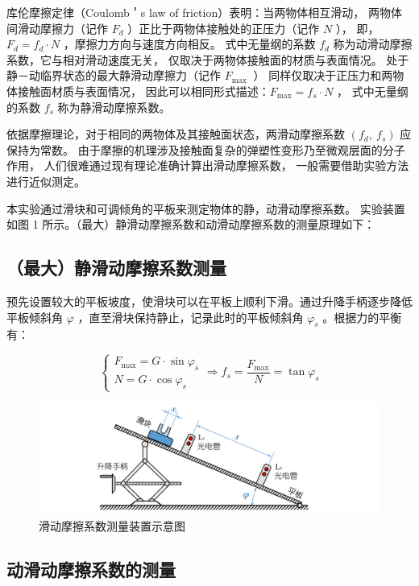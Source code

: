 库伦摩擦定律（Coulomb＇s law of friction）表明：当两物体相互滑动，
两物体间滑动摩擦力（记作 $F_d$ ）正比于两物体接触处的正压力（记作 $N$ ），
即，$F_d=f_d \cdot N$ ，摩擦力方向与速度方向相反。
式中无量纲的系数 $f_d$ 称为动滑动摩擦系数，它与相对滑动速度无关，
仅取决于两物体接触面的材质与表面情况。
处于静－动临界状态的最大静滑动摩擦力（记作 $F_{\text {max }}$ ）
同样仅取决于正压力和两物体接触面材质与表面情况，
因此可以相同形式描述：$F_{\max }=f_s \cdot N$ ，
式中无量纲的系数 $f_s$ 称为静滑动摩擦系数。    

依据摩擦理论，对于相同的两物体及其接触面状态，两滑动摩擦系数 $\left(f_d, ~ f_s\right)$ 应保持为常数。
由于摩擦的机理涉及接触面复杂的弹塑性变形乃至微观层面的分子作用，
人们很难通过现有理论准确计算出滑动摩擦系数，
一般需要借助实验方法进行近似测定。

本实验通过滑块和可调倾角的平板来测定物体的静，动滑动摩擦系数。
实验装置如图 1 所示。（最大）静滑动摩擦系数和动滑动摩擦系数的测量原理如下：

\subsection{（最大）静滑动摩擦系数测量}
预先设置较大的平板坡度，使滑块可以在平板上顺利下滑。通过升降手柄逐步降低平板倾斜角 $\varphi$ ，直至滑块保持静止，记录此时的平板倾斜角 $\varphi_s$ 。根据力的平衡有：

$$
\left\{\begin{array}{l}
F_{\max }=G \cdot \sin \varphi_s \\
N=G \cdot \cos \varphi_s
\end{array} \Rightarrow f_s=\frac{F_{\max }}{N}=\tan \varphi_s\right.
$$

\begin{figure}[h!]
    \centering
    \includegraphics[width=\textwidth]{image/滑动摩擦系数测量装置示意图.png}
    \caption{滑动摩擦系数测量装置示意图}
\end{figure}

\subsection{动滑动摩擦系数的测量}

